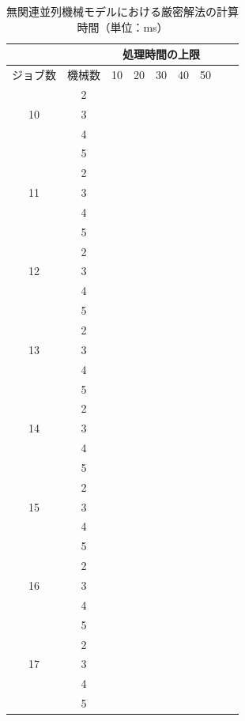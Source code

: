 \documentclass[12pt]{optlab-bachelor}
\begin{document}
\begin{table}[htb]
  \begin{center}
    \begin{tabular}{|c|c|c|c|c|c|c|c|c|} \hline
      &  & \multicolumn{5}{c|}{処理時間の上限} \\ \hline
      ジョブ数 & 機械数& 10 & 20 & 30 & 40 & 50 \\ \hline \hline
      & 2 &  &  &  &  &    \\ \cline{2-7}
      10 & 3 &  &  &  &  &    \\ \cline{2-7}
      & 4 &  &  &  &  &    \\ \cline{2-7}
      & 5 &  &  &  &  &    \\ \hline \hline
      & 2 &  &  &  &  &    \\ \cline{2-7}
      11 & 3 &  &  &  &   &  \\ \cline{2-7}
      & 4 &  &  &  &  &    \\ \cline{2-7}
      & 5 &  &  &  &  &    \\ \hline \hline
      & 2 &  &  &  &  &    \\ \cline{2-7}
      12 & 3 &  &  &  &  &  \\ \cline{2-7}
      & 4 &  &  &  &  &    \\ \cline{2-7}
      & 5 &  &  &  &  &   \\ \hline \hline
      & 2 &  &  &  &  &  \\ \cline{2-7}
      13 & 3 &  &  &  &  &  \\ \cline{2-7}
      & 4 &  &  &  &  &  \\ \cline{2-7}
      & 5 &  &  &  &  &  \\ \hline \hline
      & 2 &  &  &  &  &  \\ \cline{2-7}
      14 & 3 &  &  &  &  &  \\ \cline{2-7}
      & 4 &  &  &  &  &  \\ \cline{2-7}
      & 5 &  &  &  &  &  \\ \hline \hline
      & 2 &  &  &  &  &  \\ \cline{2-7}
      15 & 3 &  &  &  &  &  \\ \cline{2-7}
      & 4 &  &  &  &  &  \\ \cline{2-7}
      & 5 &  &  &  &  &  \\ \hline \hline
      & 2 &  &  &  &  &  \\ \cline{2-7}
      16 & 3 &  &  &  &  &  \\ \cline{2-7}
      & 4 &  &  &  &  &  \\ \cline{2-7}
      & 5 &  &  &  &  &  \\ \hline \hline
      & 2 &  &  &  &  &  \\ \cline{2-7}
      17 & 3 &  &  &  &  &  \\ \cline{2-7}
      & 4 &  &  &  &  &  \\ \cline{2-7}
      & 5 &  &  &  &  &  \\ \hline \hline
    \end{tabular}
    \caption{無関連並列機械モデルにおける厳密解法の計算時間（単位：ms）}
    \label{A8}
  \end{center}
\end{table}
\end{document}
